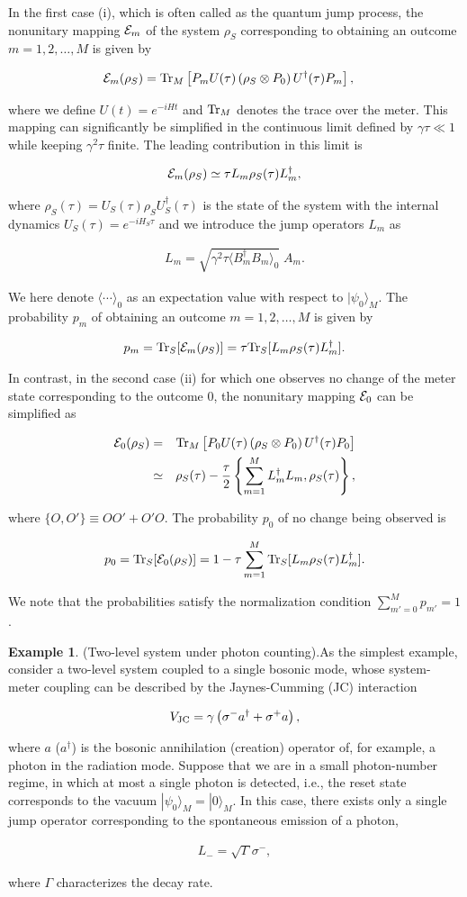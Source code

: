 \documentclass{tADP2e}
\theoremstyle{plain}
\newcommand{\eqn}[1]{
\begin{eqnarray}
	#1
\end{eqnarray}
}
\theoremstyle{plain}
\theoremstyle{definition}
\newtheorem{example}{Example}[section]
\newcommand{\exmp}[1]{
\begin{example}
	#1
\end{example}
}
\begin{document}
In the first case (i), which is often called as the quantum jump process, the nonunitary mapping ${\cal E}_{m}$ of the system $ {\rho}_{S}$ corresponding to obtaining an outcome $m=1,2,\ldots,M$ is given by
\eqn{\label{nonuni_single}
{\cal E}_{m}( {\rho}_{S}) & ={\rm Tr}_{M}\left[ {P}_{m} {U}(\tau)\left( {\rho}_{S}\otimes {P}_{0}\right) {U}^{\dagger}(\tau) {P}_{m}\right],
}  
where we define $ {U}(t)=e^{-i {H}t}$ and ${\rm Tr}_{M}$ denotes the trace over the meter. This mapping can significantly be simplified in the continuous limit defined by $\gamma\tau\ll 1$ while keeping $\gamma^2\tau$ finite. The leading contribution in this limit is
\eqn{
{\cal E}_{m}( {\rho}_{S})\simeq\tau {L}_{m} {\rho}_{S}(\tau) {L}_{m}^{\dagger},
}
where $ {\rho}_{S}(\tau)= {U}_{S}(\tau) {\rho}_{S} {U}_{S}^{\dagger}(\tau)$ is the  state of the system with the internal dynamics $U_S(\tau)=e^{-iH_S\tau}$  and we introduce the jump operators $ {L}_{m}$ as
\eqn{\label{jump}
 {L}_{m}=\sqrt{\gamma^{2}\tau\langle {B}_{m}^{\dagger} {B}_{m}\rangle_{0}}\;{A}_{m}.
}
 We here denote $\langle\cdots\rangle_{0}$ as an expectation value with respect to $|\psi_{0}\rangle_{M}$.
The probability $p_{m}$ of obtaining an outcome $m=1,2,\ldots,M$ is given by
\eqn{
p_{m}={\rm Tr}_{S}[{\cal E}_{m}( {\rho}_{S})]=\tau{\rm Tr}_{S}[ {L}_{m} {\rho}_{S}(\tau) {L}_{m}^{\dagger}].
} 
In contrast, in the second case (ii) for which one observes no change of the meter state corresponding to the outcome $0$, the nonunitary mapping ${\cal E}_{0}$ can be simplified as
\eqn{
{\cal E}_{0}( {\rho}_{S}) & =&{\rm Tr}_{M}\left[ {P}_{0} {U}(\tau)\left( {\rho}_{S}\otimes {P}_{0}\right) {U}^{\dagger}(\tau) {P}_{0}\right]\\
 & \simeq& {\rho}_{S}(\tau)-\frac{\tau}{2}\left\{ \sum_{m=1}^M {L}_{m}^{\dagger} {L}_{m}, {\rho}_{S}(\tau)\right\},
} 
where   $\{ {O}, {O}'\}\equiv  {O} {O}'+ {O}' {O}$.
The probability $p_{0}$ of  no change being observed is
\eqn{
p_{0}={\rm Tr}_{S}[{\cal E}_{0}( {\rho}_{S})]=1-\tau\sum_{m=1}^M{\rm Tr}_{S}[ {L}_{m} {\rho}_{S}(\tau) {L}_{m}^{\dagger}].
}
We note that the probabilities satisfy the normalization condition $\sum_{m'=0}^{M}p_{m'}=1$.

\exmp{(Two-level system under photon counting).\label{tlsqt} 
As the simplest example, consider a two-level system coupled to a single bosonic mode, whose system-meter coupling can be described by the Jaynes-Cumming (JC) interaction \cite{ETJ63}
\eqn{
V_{{\rm JC}}=\gamma\left(\sigma^{-}a^{\dagger}+\sigma^{+}a\right),
}
where $a$ ($a^\dagger$) is the bosonic annihilation (creation) operator of, for example, a photon in the radiation mode. Suppose that we are in a small photon-number regime, in which at most  a single photon is detected, i.e., the reset state corresponds to the vacuum $|\psi_0\rangle_M=|0\rangle_M$. In this case, there exists only a single jump operator corresponding to the spontaneous emission of a photon,   
\eqn{
L_{-}=\sqrt{\Gamma}\sigma^{-},
} 
where $\Gamma$ characterizes the decay rate. 
}
\end{document}
